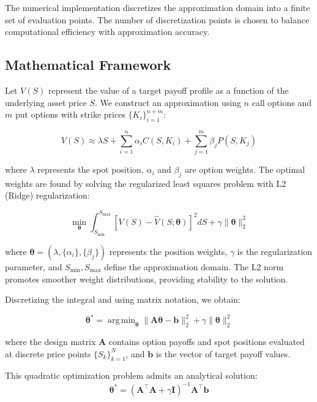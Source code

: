 \documentclass[12pt]{article}
\DeclareMathOperator*{\argmin}{arg\,min}
\begin{document}
The numerical implementation discretizes the approximation domain into a finite set of 
evaluation points. The number of discretization points is chosen to balance computational 
efficiency with approximation accuracy.

\subsection{Mathematical Framework}
Let \( V(S) \) represent the value of a target payoff profile as a function of the 
underlying asset price \( S \). We construct an approximation using \( n \) call 
options and \( m \) put options with strike prices \( \{K_i\}_{i=1}^{n+m} \):

\begin{equation}
V(S) \approx \lambda S + 
    \sum_{i=1}^{n} \alpha_i C(S, K_i) + 
    \sum_{j=1}^{m} \beta_j P(S, K_j)
\end{equation}

where \( \lambda \) represents the spot position, \( \alpha_i \) and \( \beta_j \) 
are option weights. The optimal weights are found by solving the regularized least 
squares problem with L2 (Ridge) regularization:

\begin{equation}
\min_{\boldsymbol{\theta}} 
    \int_{S_{\min}}^{S_{\max}} 
        \left[ V(S) - \hat{V}(S;\boldsymbol{\theta}) \right]^2 dS + 
    \gamma \|\boldsymbol{\theta}\|_2^2
\end{equation}

where \( \boldsymbol{\theta} = (\lambda, \{\alpha_i\}, \{\beta_j\}) \) represents
the position weights, \( \gamma \) is the regularization parameter, and 
\( S_{\min}, S_{\max} \) define the approximation domain. The L2 norm promotes 
smoother weight distributions, providing stability to the solution.

Discretizing the integral and using matrix notation, we obtain:

\begin{equation}
\boldsymbol{\theta}^* = 
    \argmin_{\boldsymbol{\theta}} 
        \|\mathbf{A}\boldsymbol{\theta} - \mathbf{b}\|_2^2 + 
        \gamma \|\boldsymbol{\theta}\|_2^2
\end{equation}

where the design matrix \( \mathbf{A} \) contains option payoffs and spot positions
evaluated at discrete price points \( \{S_k\}_{k=1}^N \), and \( \mathbf{b} \) is
the vector of target payoff values.

This quadratic optimization problem admits an analytical solution:
\begin{equation}
\boldsymbol{\theta}^* = 
    (\mathbf{A}^\top \mathbf{A} + \gamma \mathbf{I})^{-1} 
    \mathbf{A}^\top \mathbf{b}
\end{equation}
\end{document}
